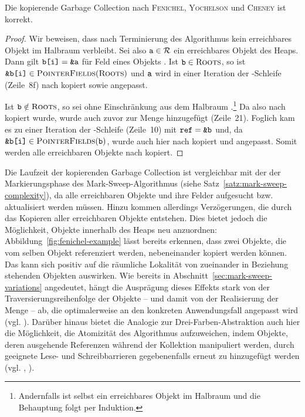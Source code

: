 \newpage

\begin{mybox}
\begin{satz}
	Die kopierende Garbage Collection nach \textsc{Fenichel}, \textsc{Yochelson} und \textsc{Cheney} ist korrekt.
\end{satz}
\end{mybox}

\begin{proof}
	Wir beweisen, dass nach Terminierung des Algorithmus kein erreichbares Objekt im Halbraum  verbleibt.
	Sei also $\texttt{a} \in \mathcal{R}$ ein erreichbares Objekt des Heaps.
	Dann gilt $\texttt{b[i]} = \texttt{\&a}$ für Feld  eines Objekts .
	Ist $\texttt{b} \in \textsc{Roots}$, so ist $\texttt{\&b[i]} \in \textsc{PointerFields}(\textsc{Roots})$ und $\texttt{a}$ wird in einer Iteration der \FOREACH-Schleife (Zeile~8f) nach  kopiert sowie  angepasst.
	
	Ist $\texttt{b} \notin \textsc{Roots}$, so sei  ohne Einschränkung aus dem Halbraum .\footnote{Andernfalls ist  selbst ein erreichbares Objekt im Halbraum  und die Behauptung folgt per Induktion.}
	Da  also nach  kopiert wurde, wurde  auch zuvor zur Menge  hinzugefügt (Zeile~21).
	Foglich kam es zu einer Iteration der \WHILE-Schleife (Zeile~10) mit $\texttt{ref} = \texttt{\&b}$ und, da $\texttt{\&b[i]} \in \textsc{PointerFields}(\texttt{b})$, wurde auch hier  nach  kopiert und  angepasst.
	Somit werden alle erreichbaren Objekte nach  kopiert.	
\end{proof}

Die Laufzeit der kopierenden Garbage Collection ist vergleichbar mit der der Markierungsphase des Mark-Sweep-Algorithmus (siehe Satz~\ref{satz:mark-sweep-complexity}), da alle erreichbaren Objekte und ihre Felder aufgesucht bzw. aktualisiert werden müssen.
Hinzu kommen allerdings Verzögerungen, die durch das Kopieren aller erreichbaren Objekte entstehen.
Dies bietet jedoch die Möglichkeit, Objekte innerhalb des Heaps neu anzuordnen:
Abbildung~\ref{fig:fenichel-example} lässt bereits erkennen, dass zwei Objekte, die vom selben Objekt referenziert werden, nebeneinander kopiert werden können.
Das kann sich positiv auf die räumliche Lokalität von zueinander in Beziehung stehenden Objekten auswirken.
Wie bereits in Abschnitt~\ref{sec:mark-sweep-variations} angedeutet, hängt die Ausprägung dieses Effekts stark von der Traversierungsreihenfolge der Objekte -- und damit von der Realisierung der Menge  -- ab, die optimalerweise an den konkreten Anwendungsfall angepasst wird (vgl. \cite[Kap. 4.2]{handbook}).
Darüber hinaus bietet die Analogie zur Drei-Farben-Abstraktion auch hier die Möglichkeit, die Atomizität des Algorithmus aufzuweichen, indem Objekte, deren ausgehende Referenzen während der Kollektion manipuliert werden, durch geeignete Lese- und Schreibbarrieren gegebenenfalls erneut zu  hinzugefügt werden (vgl. \cite[S. 129]{kero2007}, \cite[S. 41]{hosking2006}).

